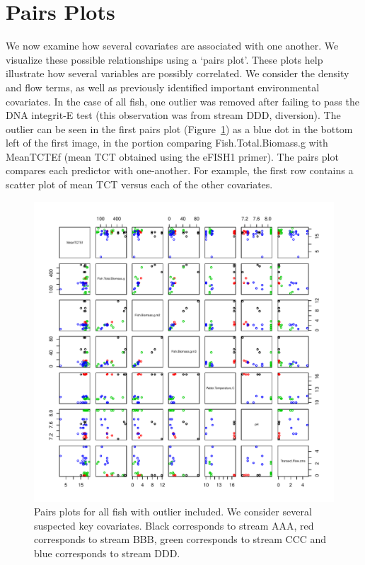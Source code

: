 \section{Pairs Plots}



	We now examine how several covariates are associated with one another. We visualize these possible relationships using a `pairs plot'. These plots help illustrate how several variables are possibly correlated. We consider the density and flow terms, as well as previously identified important environmental covariates.  In the case of all fish, one outlier was removed after failing to pass the DNA integrit-E test (this observation was from stream DDD, diversion). The outlier can be seen in the first pairs plot (Figure~\ref{fig:pairefoi}) as a blue dot in the bottom left of the first image, in the portion comparing Fish.Total.Biomass.g with MeanTCTEf (mean TCT obtained using the eFISH1 primer). The pairs plot compares each predictor with one-another. For example, the first row contains a scatter plot of mean TCT versus each of the other covariates.



\begin{figure}[H]
\includegraphics{Chapter5Images/EFishpairs_outlierincluded.pdf}
\caption{  \hspace{1mm}  Pairs plots for all fish with outlier included. We consider several suspected key covariates. Black corresponds to stream AAA, red corresponds to stream BBB, green corresponds to stream CCC and blue corresponds to stream DDD.}
\label{fig:pairefoi}
\end{figure}




